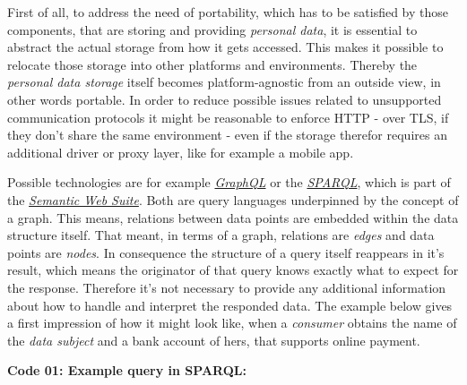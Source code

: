 \documentclass[12pt,english,a4paper,titlepage,cleardoublepage=empty,dottedtoc]{report}
\newenvironment{Shaded}{}{}
\newcommand{\KeywordTok}[1]{\textcolor[rgb]{0.00,0.44,0.13}{\textbf{{#1}}}}
\newcommand{\DecValTok}[1]{\textcolor[rgb]{0.25,0.63,0.44}{{#1}}}
\newcommand{\StringTok}[1]{\textcolor[rgb]{0.25,0.44,0.63}{{#1}}}
\newcommand{\NormalTok}[1]{{#1}}
\begin{document}
First of all, to address the need of portability, which has to be
satisfied by those components, that are storing and providing
\emph{personal data}, it is essential to abstract the actual storage
from how it gets accessed. This makes it possible to relocate those
storage into other platforms and environments. Thereby the
\emph{personal data storage} itself becomes platform-agnostic from an
outside view, in other words portable. In order to reduce possible
issues related to unsupported communication protocols it might be
reasonable to enforce HTTP - over TLS, if they don't share the same
environment - even if the storage therefor requires an additional driver
or proxy layer, like for example a mobile app.

Possible technologies are for example
\emph{\protect\hyperlink{link-graphql}{GraphQL}} or the
\emph{\protect\hyperlink{link-sparql}{SPARQL}}, which is part of the
\emph{\protect\hyperlink{link-semantic-web}{Semantic Web Suite}}. Both
are query languages underpinned by the concept of a graph. This means,
relations between data points are embedded within the data structure
itself. That meant, in terms of a graph, relations are \emph{edges} and
data points are \emph{nodes}. In consequence the structure of a query
itself reappears in it's result, which means the originator of that
query knows exactly what to expect for the response. Therefore it's not
necessary to provide any additional information about how to handle and
interpret the responded data. The example below gives a first impression
of how it might look like, when a \emph{consumer} obtains the name of
the \emph{data subject} and a bank account of hers, that supports online
payment.

\textbf{\protect\hypertarget{code-01_sparql-query}{}{Code 01: Example
query in SPARQL}:}

\begin{Shaded}
\end{Shaded}
\end{document}
